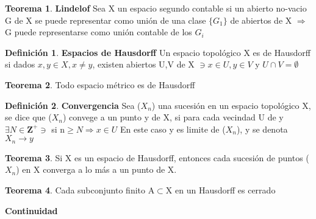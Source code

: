 \documentclass{article}
\theoremstyle{definition}
\newtheorem{definition}{Definición}[section]
\newtheorem{theorem}{Teorema}[section]
\begin{document}
\begin{theorem}{\textbf{Lindelof}}
	Sea X un espacio segundo contable si un abierto no-vacio G de X se puede representar como unión de una clase $\{G_1\}$ de abiertos de X $\Rightarrow$ G puede representarse como unión contable de los $G_i$
\end{theorem}
\begin{definition}{\textbf{Espacios de Hausdorff}}
	Un espacio topológico X es de Hausdorff si dados $x,y\in X, x\neq y$, existen abiertos U,V de X $\ni x\in U,y\in V$ y $U\cap V = \emptyset$
\end{definition}
\begin{theorem}
	Todo espacio métrico es de Hausdorff 
\end{theorem}
\begin{definition}{\textbf{Convergencia}}
	Sea ($X_n$) una sucesión en un espacio topológico X, se dice que ($X_n$) convege a un punto y de X, si para cada vecindad U de y $\exists N\in \mathbf{Z}^+\ni$ si n$\geq N\Rightarrow x\in U$ En este caso y es limite de ($X_n$), y se denota $X_n\to y$
\end{definition}	
\begin{theorem}
	Si X es un espacio de Hausdorff, entonces cada sucesión de puntos ($X_n$) en X converga a lo más a un punto de X.
\end{theorem}
\begin{theorem}
	Cada subconjunto finito A$\subset$X en un Hausdorff es cerrado
\end{theorem}


\textbf{Continuidad}
\end{document}
